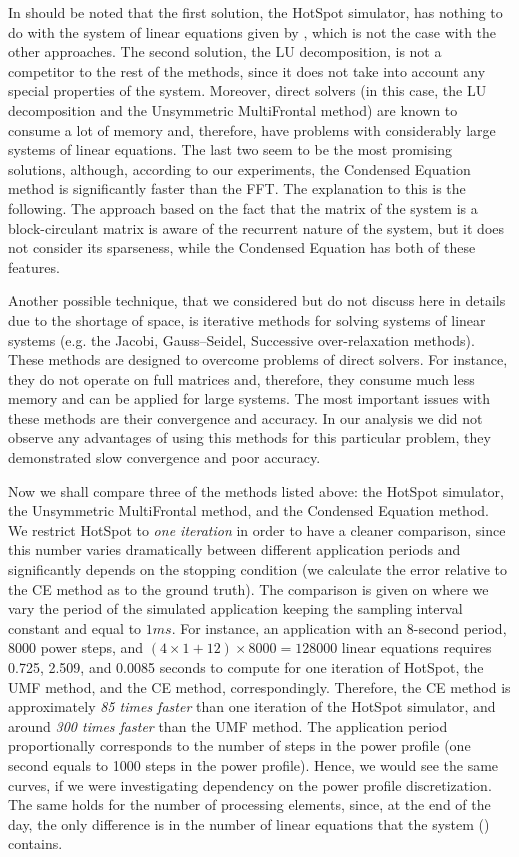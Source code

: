 In should be noted that the first solution, the HotSpot simulator, has nothing to do with the system of linear equations given by , which is not the case with the other approaches. The second solution, the LU decomposition, is not a competitor to the rest of the methods, since it does not take into account any special properties of the system. Moreover, direct solvers (in this case, the LU decomposition and the Unsymmetric MultiFrontal method) are known to consume a lot of memory and, therefore, have problems with considerably large systems of linear equations. The last two seem to be the most promising solutions, although, according to our experiments, the Condensed Equation method is significantly faster than the FFT. The explanation to this is the following. The approach based on the fact that the matrix of the system is a block-circulant matrix is aware of the recurrent nature of the system, but it does not consider its sparseness, while the Condensed Equation has both of these features.

Another possible technique, that we considered but do not discuss here in details due to the shortage of space, is iterative methods for solving systems of linear systems (e.g. the Jacobi, Gauss–Seidel, Successive over-relaxation methods). These methods are designed to overcome problems of direct solvers. For instance, they do not operate on full matrices and, therefore, they consume much less memory and can be applied for large systems. The most important issues with these methods are their convergence and accuracy. In our analysis we did not observe any advantages of using this methods for this particular problem, they demonstrated slow convergence and poor accuracy.

Now we shall compare three of the methods listed above: the HotSpot simulator, the Unsymmetric MultiFrontal method, and the Condensed Equation method. We restrict HotSpot to \emph{one iteration} in order to have a cleaner comparison, since this number varies dramatically between different application periods and significantly depends on the stopping condition (we calculate the error relative to the CE method as to the ground truth). The comparison is given on  where we vary the period of the simulated application keeping the sampling interval constant and equal to $1 ms$. For instance, an application with an 8-second period, 8000 power steps, and $(4 \times 1 + 12) \times 8000 = 128000$ linear equations requires 0.725, 2.509, and 0.0085 seconds to compute for one iteration of HotSpot, the UMF method, and the CE method, correspondingly. Therefore, the CE method is approximately \emph{85 times faster} than one iteration of the HotSpot simulator, and around \emph{300 times faster} than the UMF method. The application period proportionally corresponds to the number of steps in the power profile (one second equals to 1000 steps in the power profile). Hence, we would see the same curves, if we were investigating dependency on the power profile discretization. The same holds for the number of processing elements, since, at the end of the day, the only difference is in the number of linear equations that the system () contains.
